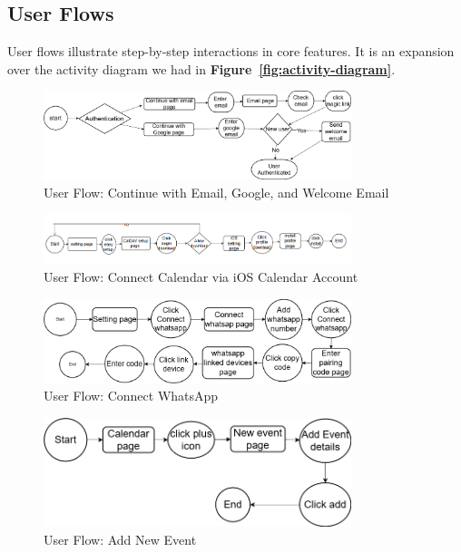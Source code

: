 \subsection{User Flows}

User flows illustrate step-by-step interactions in core features. It is an expansion over the activity diagram we had in \textbf{Figure~\ref{fig:activity-diagram}}.

\begin{figure}[H]
    \centering
    \includegraphics[width=0.8\textwidth]{images/Login user flow.drawio.png}
    \caption{User Flow: Continue with Email, Google, and Welcome Email}
    \label{fig:userflow-login}
\end{figure}

\begin{figure}[H]
    \centering
    \includegraphics[width=0.8\textwidth]{images/add jadwal calendar to ios calendar account.png}
    \caption{User Flow: Connect Calendar via iOS Calendar Account}
    \label{fig:userflow-connect-calendar}
\end{figure}

\begin{figure}[H]
    \centering
    \includegraphics[width=0.8\textwidth]{images/connect whatsap.drawio.png}
    \caption{User Flow: Connect WhatsApp}
    \label{fig:userflow-connect-whatsapp}
\end{figure}

\begin{figure}[H]
    \centering
    \includegraphics[width=0.8\textwidth]{images/add event.drawio.png}
    \caption{User Flow: Add New Event}
    \label{fig:userflow-add-event}
\end{figure}

